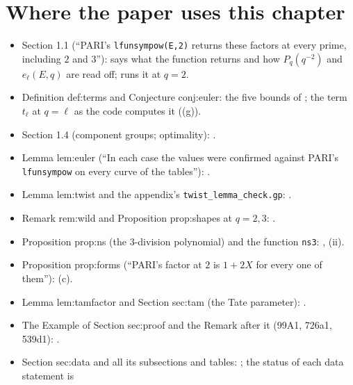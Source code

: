 \section*{Where the paper uses this chapter}
\begin{sloppypar}

\begin{itemize}
\item Section 1.1 (``PARI's \texttt{lfunsympow(E,2)} returns these factors at every prime, including $2$ and $3$''):  says what the
function returns and how $P_q(q^{-2})$ and $e_\ell(E,q)$ are read off;  runs it at $q=2$.
\item Definition def:terms and Conjecture conj:euler: the five bounds of ; the term $t_\ell$ at $q=\ell$ as the code computes it
((g)).
\item Section 1.4 (component groups; optimality): .
\item Lemma lem:euler (``In each case the values were confirmed against PARI's \texttt{lfunsympow} on every curve of the tables''): .
\item Lemma lem:twist and the appendix's \texttt{twist\_lemma\_check.gp}: .
\item Remark rem:wild and Proposition prop:shapes at $q=2,3$: .
\item Proposition prop:ns (the $3$-division polynomial) and the function \texttt{ns3}: , (ii).
\item Proposition prop:forms (``PARI's factor at $2$ is $1+2X$ for every one of them''): (c).
\item Lemma lem:tamfactor and Section sec:tam (the Tate parameter): .
\item The Example of Section sec:proof and the Remark after it (99A1, 726a1, 539d1): .
\item Section sec:data and all its subsections and tables: ; the status of each data statement is

\end{itemize}
\end{sloppypar}
